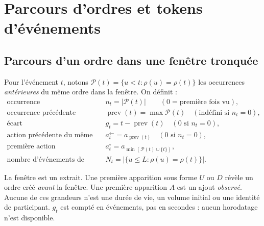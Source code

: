 \section{Parcours d'ordres et tokens d'événements}\label{sec:ordres}

\subsection{Parcours d'un ordre dans une fenêtre tronquée}
Pour l'événement $t$, notons $\mathcal{P}(t)=\{u<t:\rho(u)=\rho(t)\}$ les occurrences \emph{antérieures} du même ordre dans la fenêtre. On définit :
\begin{align}
\text{occurrence}\quad & n_t=|\mathcal{P}(t)|\qquad(0=\text{première fois vu}),\\
\text{occurrence précédente}\quad & \operatorname{prev}(t)=\max\mathcal{P}(t)\quad(\text{indéfini si }n_t=0),\\
\text{écart}\quad & g_t=t-\operatorname{prev}(t)\quad(0\text{ si }n_t=0),\\
\text{action précédente du même ordre}\quad & a^{\leftarrow}_t=a_{\operatorname{prev}(t)}\quad(0\text{ si }n_t=0),\\
\text{première action}\quad & a^{\circ}_t=a_{\min(\mathcal{P}(t)\cup\{t\})},\\
\text{nombre d'événements de l'ordre}\quad & N_t=|\{u\le L:\rho(u)=\rho(t)\}| .
\end{align}

\begin{remarque}[Troncature]
La fenêtre est un extrait. Une première apparition sous forme $U$ ou $D$ révèle un ordre créé \emph{avant} la fenêtre. Une première apparition $A$ est un ajout \emph{observé}. Aucune de ces grandeurs n'est une durée de vie, un volume initial ou une identité de participant. $g_t$ est compté en événements, pas en secondes : aucun horodatage n'est disponible.
\end{remarque}

